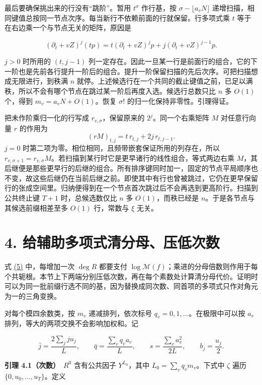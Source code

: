 \documentclass[11pt,a4paper]{article}
\begin{document}
最后要确保挑出来的行没有``跳阶''。暂用 \(t^\sigma\) 作行基，按 \(\sigma-\lfloor a_vN\rfloor\) 递增扫描，相同键值总按同一节点次序。每当新行不依赖前面的行就保留。行多项式乘 \(t\) 等于在右边乘一个与节点无关的矩阵，原因是

\[
 (\partial_t+vZ)^j(tp)=t(\partial_t+vZ)^jp+j(\partial_t+vZ)^{j-1}p .
\]

\(j>0\) 时所用的 \((t,j-1)\) 列一定存在。因此一旦某一行是前面行的组合，它的下一阶也是先前各行提升一阶后的组合。提升一阶保留扫描的先后次序。可把扫描想成无限进行，到秩满 \(n\) 就停。上述候选行在一个共同的截止键值之前，已足以满秩，所以不会有哪个节点在跳过某一阶后再度入选。候选行总数只比 \(n\) 多 \(O(1)\) 个，得到 \(m_v=a_vN+O(1)\)。恢复 \(\sigma!\) 的归一化保持非零性。引理得证。

把未作阶乘归一化的行写成 \(r_{v,\sigma}\)，保留原来的 \(2^j\)。同一个右乘矩阵 \(M\) 对任意行向量 \(r\) 的作用为 \[
 (rM)_{t,j}=t\,r_{t,j}+2j\,r_{t,j-1}.
\] \(j=0\) 时第二项为零。相位相同，且频带嵌套保证所用的列存在，所以 \(r_{v,\sigma+1}=r_{v,\sigma}M\)。若扫描到某行时它是更早诸行的线性组合，等式两边右乘 \(M\)，其后继便是那些更早行的后继的组合。所有排序键同时加一，固定的节点平局顺序也不变，故这些后继仍在当前后继之前。即使其中有行也曾被跳过，它仍在更早保留行的张成空间里。归纳便得到在一个节点首次跳过后不会再选到更高阶行。扫描到公共终止键 \(T+1\) 时，总候选数仅比 \(n\) 多 \(O(1)\)，而秩已经是 \(n\)。于是各节点与其候选前缀相差至多 \(O(1)\) 行，常数与 \(\xi\) 无关。

\section{4. 给辅助多项式清分母、压低次数}\label{ux7ed9ux8f85ux52a9ux591aux9879ux5f0fux6e05ux5206ux6bcdux538bux4f4eux6b21ux6570}

式 \hyperref[eq:5]{(5)} 中，每增加一次 \(\deg R\) 都要支付 \(\log\mathcal M(f)\)；乘进的分母倍数则作用于每个共轭根。本节上下两端分别压低次数，再在每个素数处计算清分母代价。证明时可以为同一批前缀行选不同的基，因为替换成同次数、同首项的多项式只作对角元为一的三角变换。

对每个模四余数类，按 \(m_v\) 递减排列，依次标号 \(q_v=0,1,\ldots\)。在极限中可以按 \(a_v\) 排列，等大的两项交换不会影响加权和。记

\[
 \bar j=\frac{2\sum_j ju_j}{L},\qquad \bar q=\frac{\sum_v q_va_v}{L},
 \qquad s=\frac{\sum_v a_v^2}{2L},\qquad b_j=\frac{u_j}{2}.                \tag{7}\label{eq:7}
\]

\textbf{引理 4.1（次数）}　\(R^0\) 含有公共因子 \(Y^{L_0}\)，其中 \(L_0=\sum_vq_vm_v\)。下式中 \(\zeta\) 遍历 \(\{0,u_0,\ldots,u_T\}\)。定义
\end{document}
